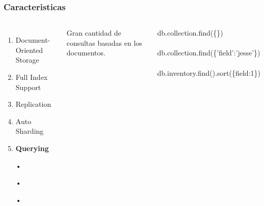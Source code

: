 \documentclass{beamer}
\begin{document}
\begin{frame}
\frametitle{Caracteristicas}
\begin{columns}[c] %

\begin{enumerate}
\item Document-Oriented Storage
\item Full Index Support
\item Replication
\item Auto Sharding
\item \textbf{Querying}
\item[•]	
\item[•]	
\item[•]	
\end{enumerate}

Gran cantidad de consultas basadas en los documentos.
\begin{example}[querys]
db.collection.find(\{\})
\\~\\
db.collection.find(\{'field':'jesse'\})
\\~\\
db.inventory.find().sort(\{field:1\})
\end{example}
\end{columns}	
\end{frame}
\end{document}
